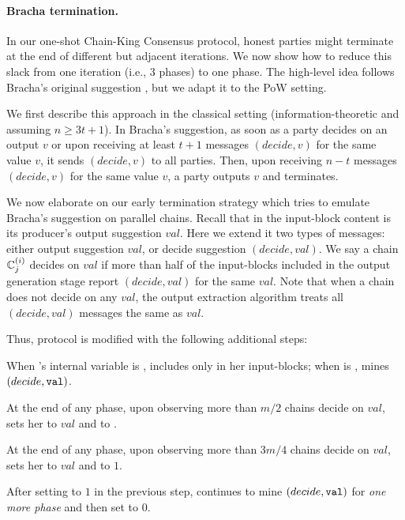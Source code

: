 \paragraph{Bracha termination.}
%
In our one-shot Chain-King Consensus protocol, honest parties might terminate at the end of different but adjacent iterations.
%
We now show how to reduce this slack from one iteration (i.e., 3 phases) to one phase.
%
The high-level idea follows Bracha's original suggestion \cite{PODC:Bracha84}, but we adapt it to the PoW setting.

We first describe this approach in the classical setting (information-theoretic and assuming $n \ge 3t + 1$).
%
In Bracha's suggestion, as soon as a party decides on an output $v$ or upon receiving at least $t + 1$ messages $(decide, v)$ for the same value $v$, it sends $(decide, v)$ to all parties.
%
Then, upon receiving $n - t$ messages $(decide, v)$ for the same value $v$, a party outputs $v$ and terminates.

We now elaborate on our early termination strategy which tries to emulate Bracha's suggestion on parallel chains.
%
Recall that in \chainKingConsensus the input-block content is its producer's output suggestion $val$. Here we extend it two types of messages: either output suggestion $val$, or decide suggestion $(decide, val)$.
%
We say a chain $\mathbb{C}^{(i)}_j$ decides on $val$ if more than half of the input-blocks included in the output generation stage report $(decide, val)$ for the same $val$.
%
Note that when a chain does not decide on any $val$, the output extraction algorithm treats all $(decide, val)$ messages the same as $val$.

Thus, protocol \chainKingConsensus is modified with the following additional steps:

\begin{cccItemize}[noitemsep]
    \item When \party's internal variable \decide is \false, \party includes only \val in her input-blocks; when \decide is \true, \party mines $(decide, \mathtt{val})$.

    \item At the end of any phase, upon observing more than $m / 2$ chains decide on $val$, \party sets her \val to $val$ and \decide to \true.

    \item At the end of any phase, upon observing more than $3m / 4$ chains decide on $val$, \party sets her \val to $val$ and \exit to $1$.

    \item After setting \exit to $1$ in the previous step, \party continues to mine $(decide, \mathtt{val})$ for \emph{one more phase} and then set \exit to $0$.
\end{cccItemize}

